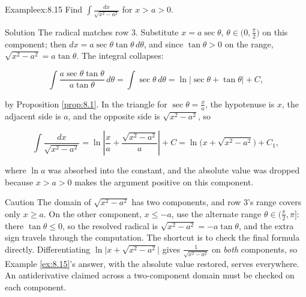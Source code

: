 \documentclass[a4paper,12pt,oneside]{memoir}
\begin{document}
\begin{workedexample}
\begin{envexample}{Example}{ex:8.15}{}
Find \(\displaystyle\int \frac{dx}{\sqrt{x^{2} - a^{2}}}\) for \(x > a > 0\).
\end{envexample}
\begin{envsolution}{Solution}{}{}
The radical matches row 3. Substitute \(x = a\sec\theta\), \(\theta \in \bigl(0, \tfrac{\pi}{2}\bigr)\) on this component; then \(dx = a\sec\theta\tan\theta\,d\theta\), and since \(\tan\theta > 0\) on the range, \(\sqrt{x^{2} - a^{2}} = a\tan\theta\). The integral collapses:

\[ \int \frac{a\sec\theta\tan\theta}{a\tan\theta}\,d\theta = \int \sec\theta\,d\theta = \ln\lvert\sec\theta + \tan\theta\rvert + C, \]

by Proposition \ref{prop:8.1}. In the triangle for \(\sec\theta = \tfrac{x}{a}\), the hypotenuse is \(x\), the adjacent side is \(a\), and the opposite side is \(\sqrt{x^{2} - a^{2}}\), so

\[ \int \frac{dx}{\sqrt{x^{2} - a^{2}}} = \ln\left\lvert \frac{x}{a} + \frac{\sqrt{x^{2} - a^{2}}}{a} \right\rvert + C = \ln\bigl(x + \sqrt{x^{2} - a^{2}}\bigr) + C_{1}, \]

where \(\ln a\) was absorbed into the constant, and the absolute value was dropped because \(x > a > 0\) makes the argument positive on this component. \qedmark
\end{envsolution}
\end{workedexample}
\begin{envcaution}{Caution}{}{}
The domain of \(\sqrt{x^{2} - a^{2}}\) has two components, and row 3’s range covers only \(x \ge a\). On the other component, \(x \le -a\), use the alternate range \(\theta \in \bigl(\tfrac{\pi}{2}, \pi\bigr]\): there \(\tan\theta \le 0\), so the resolved radical is \(\sqrt{x^{2} - a^{2}} = -a\tan\theta\), and the extra sign travels through the computation. The shortcut is to check the final formula directly. Differentiating \(\ln\bigl\lvert x + \sqrt{x^{2} - a^{2}}\bigr\rvert\) gives \(\tfrac{1}{\sqrt{x^{2} - a^{2}}}\) on \emph{both} components, so Example \ref{ex:8.15}’s answer, with the absolute value restored, serves everywhere. An antiderivative claimed across a two-component domain must be checked on each component.
\end{envcaution}
\end{document}
